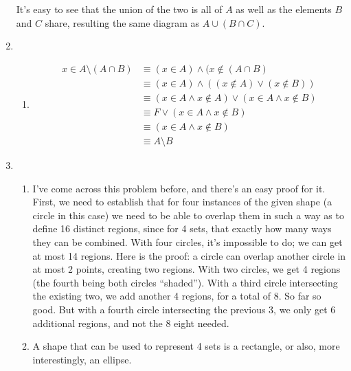 \documentclass{article}
\begin{document}
\begin{enumerate}
    It's easy to see that the union of the two is all of $A$ as well as the elements $B$ and $C$ share, resulting the same diagram as $A \cup (B \cap C)$.
\item
  \begin{enumerate}
  \item
    \begin{equation*}
      \begin{aligned}
	x \in A \setminus (A \cap B) &\equiv (x \in A) \land (x \notin (A \cap B) \\
	&\equiv (x \in A) \land ((x \notin A) \lor (x \notin B)) \\
	&\equiv (x \in A \land x \notin A) \lor (x \in A \land x \notin B) \\
	&\equiv F \lor (x \in A \land x \notin B) \\
	&\equiv (x \in A \land x \notin B) \\
	&\equiv A \setminus B
      \end{aligned}
    \end{equation*}
    \end{enumerate}
\item
  \begin{enumerate}
    \item
  I've come across this problem before, and there's an easy proof for it.  First, we need to establish that for four instances of the given shape (a circle in this case) we need to be able to overlap them in such a way as to define 16 distinct regions, since for 4 sets, that exactly how many ways they can be combined.	 With four circles, it's impossible to do; we can get at most 14 regions.  Here is the proof: a circle can overlap another circle in at most 2 points, creating two regions.  With two circles, we get 4 regions (the fourth being both circles ``shaded'').  With a third circle intersecting the existing two, we add another 4 regions, for a total of 8.  So far so good.  But with a fourth circle intersecting the previous 3, we only get 6 additional regions, and not the 8 eight needed.
\item
  A shape that can be used to represent 4 sets is a rectangle, or also, more interestingly, an ellipse.
  \end{enumerate}
\end{enumerate}
\end{document}
